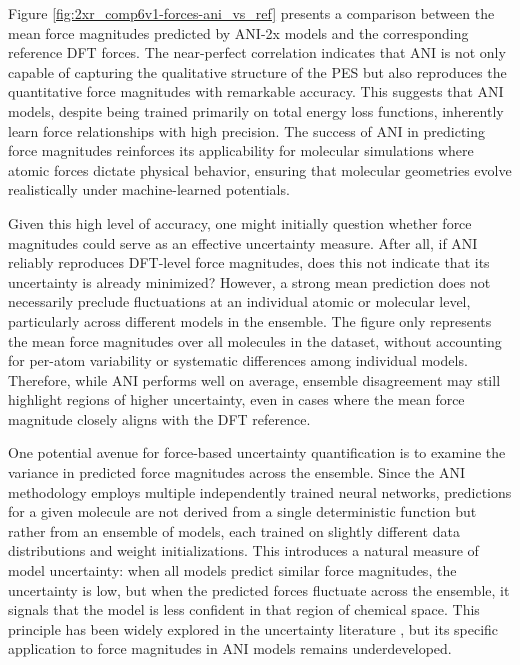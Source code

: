 Figure \ref{fig:2xr_comp6v1-forces-ani_vs_ref} presents a comparison between the mean force magnitudes predicted by ANI-2x models and the corresponding reference DFT forces. The near-perfect correlation indicates that ANI is not only capable of capturing the qualitative structure of the PES but also reproduces the quantitative force magnitudes with remarkable accuracy. This suggests that ANI models, despite being trained primarily on total energy loss functions, inherently learn force relationships with high precision. The success of ANI in predicting force magnitudes reinforces its applicability for molecular simulations where atomic forces dictate physical behavior, ensuring that molecular geometries evolve realistically under machine-learned potentials.

Given this high level of accuracy, one might initially question whether force magnitudes could serve as an effective uncertainty measure. After all, if ANI reliably reproduces DFT-level force magnitudes, does this not indicate that its uncertainty is already minimized? However, a strong mean prediction does not necessarily preclude fluctuations at an individual atomic or molecular level, particularly across different models in the ensemble. The figure only represents the mean force magnitudes over all molecules in the dataset, without accounting for per-atom variability or systematic differences among individual models. Therefore, while ANI performs well on average, ensemble disagreement may still highlight regions of higher uncertainty, even in cases where the mean force magnitude closely aligns with the DFT reference.

One potential avenue for force-based uncertainty quantification is to examine the variance in predicted force magnitudes across the ensemble. Since the ANI methodology employs multiple independently trained neural networks, predictions for a given molecule are not derived from a single deterministic function but rather from an ensemble of models, each trained on slightly different data distributions and weight initializations. This introduces a natural measure of model uncertainty: when all models predict similar force magnitudes, the uncertainty is low, but when the predicted forces fluctuate across the ensemble, it signals that the model is less confident in that region of chemical space. This principle has been widely explored in the uncertainty literature \cite{uncertainty_atomistic_ml_peterson, uncertainty_of_nnp_ensembles_kahle}, but its specific application to force magnitudes in ANI models remains underdeveloped.


